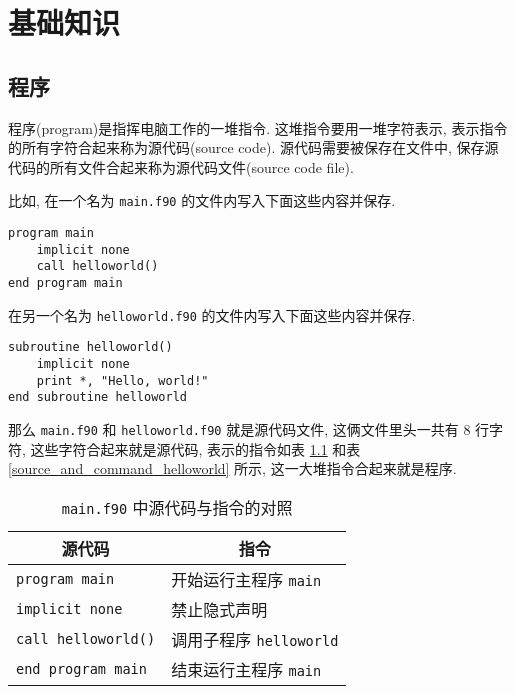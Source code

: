 \chapter{基础知识}

\section{程序}\label{fortran_program}

程序(program)是指挥电脑工作的一堆指令. 这堆指令要用一堆字符表示, 表示指令的所有字符合起来称为源代码(source code). 源代码需要被保存在文件中, 保存源代码的所有文件合起来称为源代码文件(source code file).

比如, 在一个名为 \texttt{main.f90} 的文件内写入下面这些内容并保存.
\begin{lstlisting}
program main
    implicit none
    call helloworld()
end program main
\end{lstlisting}
在另一个名为 \texttt{helloworld.f90} 的文件内写入下面这些内容并保存.
\begin{lstlisting}
subroutine helloworld()
    implicit none
    print *, "Hello, world!"
end subroutine helloworld
\end{lstlisting}
那么 \texttt{main.f90} 和 \texttt{helloworld.f90} 就是源代码文件, 这俩文件里头一共有 8 行字符, 这些字符合起来就是源代码, 表示的指令如表 \ref{source_and_command_main} 和表 \ref{source_and_command_helloworld} 所示, 这一大堆指令合起来就是程序.
\begin{table}[!htbp]
    \centering
    \begin{tabular}{|p{}|p{}|}
        \hline
        \multicolumn{1}{|c|}{源代码}&\multicolumn{1}{|c|}{指令}\\
        \hline
        \texttt{program main}&开始运行主程序 \texttt{main}\\
        \hline
        \texttt{implicit none}&禁止隐式声明\\
        \hline
        \texttt{call helloworld()}&调用子程序 \texttt{helloworld}\\
        \hline
        \texttt{end program main}&结束运行主程序 \texttt{main}\\
        \hline
    \end{tabular}
    \caption{\texttt{main.f90} 中源代码与指令的对照}\label{source_and_command_main}
\end{table}

